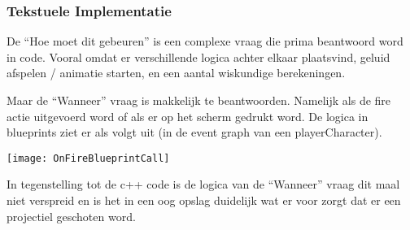 \subsubsection{Tekstuele Implementatie}
De “Hoe moet dit gebeuren” is een complexe vraag die prima beantwoord word in code. Vooral omdat er verschillende logica achter elkaar plaatsvind, geluid afspelen / animatie starten, en een aantal wiskundige berekeningen. 

Maar de “Wanneer” vraag is makkelijk te beantwoorden. Namelijk als de fire actie uitgevoerd word of als er op het scherm gedrukt word. De logica in blueprints ziet er als volgt uit (in de event graph van een playerCharacter).

\texttt{[image: OnFireBlueprintCall]}

In tegenstelling tot de c++ code is de logica van de “Wanneer” vraag dit maal niet verspreid en is het in een oog opslag duidelijk wat er voor zorgt dat er een projectiel geschoten word.